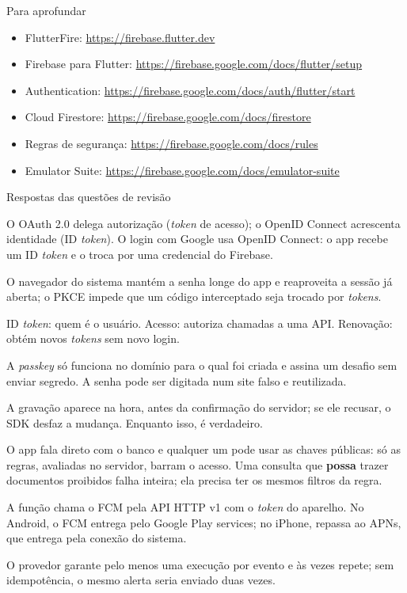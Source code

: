 \documentclass[aspectratio=169,10pt]{beamer}
\begin{document}
\begin{frame}{Para aprofundar}
  \small
  \begin{itemize}
    \item FlutterFire: \url{https://firebase.flutter.dev}
    \item Firebase para Flutter: \url{https://firebase.google.com/docs/flutter/setup}
    \item Authentication: \url{https://firebase.google.com/docs/auth/flutter/start}
    \item Cloud Firestore: \url{https://firebase.google.com/docs/firestore}
    \item Regras de segurança: \url{https://firebase.google.com/docs/rules}
    \item Emulator Suite: \url{https://firebase.google.com/docs/emulator-suite}
  \end{itemize}
\end{frame}

\begin{frame}{Respostas das questões de revisão}
  \begin{respostas}
    \item O OAuth 2.0 delega autorização (\emph{token} de acesso); o OpenID Connect acrescenta identidade (ID \emph{token}). O login com Google usa OpenID Connect: o app recebe um ID \emph{token} e o troca por uma credencial do Firebase.
    \item O navegador do sistema mantém a senha longe do app e reaproveita a sessão já aberta; o PKCE impede que um código interceptado seja trocado por \emph{tokens}.
    \item ID \emph{token}: quem é o usuário. Acesso: autoriza chamadas a uma API. Renovação: obtém novos \emph{tokens} sem novo login.
    \item A \emph{passkey} só funciona no domínio para o qual foi criada e assina um desafio sem enviar segredo. A senha pode ser digitada num site falso e reutilizada.
    \item A gravação aparece na hora, antes da confirmação do servidor; se ele recusar, o SDK desfaz a mudança. Enquanto isso,  é verdadeiro.
    \item O app fala direto com o banco e qualquer um pode usar as chaves públicas: só as regras, avaliadas no servidor, barram o acesso. Uma consulta que \textbf{possa} trazer documentos proibidos falha inteira; ela precisa ter os mesmos filtros da regra.
    \item A função chama o FCM pela API HTTP v1 com o \emph{token} do aparelho. No Android, o FCM entrega pelo Google Play services; no iPhone, repassa ao APNs, que entrega pela conexão do sistema.
    \item O provedor garante pelo menos uma execução por evento e às vezes repete; sem idempotência, o mesmo alerta seria enviado duas vezes.
  \end{respostas}
\end{frame}

\end{document}
